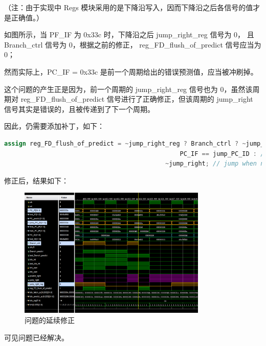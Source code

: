 \documentclass{article}
\begin{document}
\begin{enumerate}
\begin{enumerate}
        \newpage
        （注：由于实现中 Regs 模块采用的是下降沿写入，因而下降沿之后各信号的值才是正确值。）\par
        如图所示，当 PF\_IF 为 0x33c 时，下降沿之后 jump\_right\_reg 信号为 0， 且 Branch\_ctrl 信号为 0，根据之前的修正， reg\_FD\_flush\_of\_predict 信号应当为 0；\par
        然而实际上，PC\_IF = 0x33c 是前一个周期给出的错误预测值，应当被冲刷掉。\par
        这个问题的产生正是因为，前一个周期的 jump\_right\_reg 信号也为 0，虽然该周期对 reg\_FD\_flush\_of\_predict 信号进行了正确修正，但该周期的 jump\_right 信号其实是错误的，且被传递到了下一个周期。\par
        
        因此，仍需要添加补丁，如下：\par
        \begin{lstlisting}[language=Verilog]
    assign reg_FD_flush_of_predict = ~jump_right_reg ? Branch_ctrl ? ~jump_right : 
                                                PC_IF == jump_PC_ID : // jump right
                                            ~jump_right; // jump when no branch
        \end{lstlisting}

        \newpage
        修正后，结果如下：\par
        \begin{figure}[h]
            \centering
            \includegraphics[width=0.8\textwidth]{image/flush_jump_right_reg_reg_fix.png}
            \caption{问题的延续修正}
        \end{figure}
        可见问题已经解决。\par
    \end{enumerate}
\end{enumerate}
\end{document}
